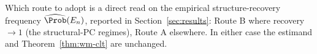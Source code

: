 Which route to adopt is a direct read on the empirical structure-recovery frequency
$\widehat{\Prob}(E_n)$, reported in Section~\ref{sec:results}: Route B where recovery
$\to 1$ (the structural-PC regimes), Route A elsewhere. In either case the estimand and
Theorem~\ref{thm:wm-clt} are unchanged.


%
%
%
%
%
%
